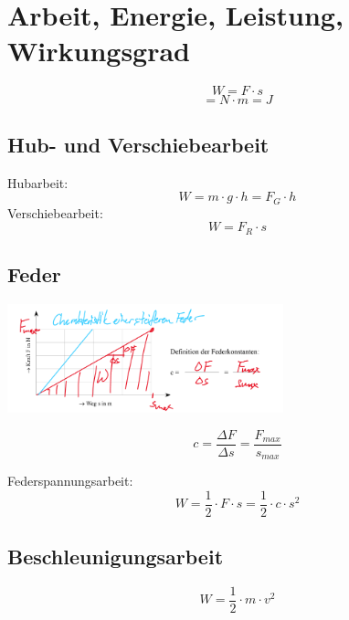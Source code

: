 \documentclass[a4paper]{IEEEtran}
\begin{document}
  \section{Arbeit, Energie, Leistung, Wirkungsgrad}
  \begin{equation}
    W = F \cdot s
  \end{equation}
  \begin{equation}
    [W] = N \cdot m = J
  \end{equation}

  \subsection{Hub- und Verschiebearbeit}
  Hubarbeit:
  \begin{equation}
    W = m \cdot g \cdot h = F_G \cdot h
  \end{equation}
  Verschiebearbeit:
  \begin{equation}
    W = F_R \cdot s
  \end{equation}

  \subsection{Feder}
  \begin{center}
    \includegraphics[width=8cm]{images/spring.png}
  \end{center}

  \begin{equation}
    c = \frac{\Delta F}{\Delta s} = \frac{F_{max}}{s_{max}}
  \end{equation}
  
  Federspannungsarbeit:
  \begin{equation}
    W = \frac{1}{2} \cdot F \cdot s = \frac{1}{2} \cdot c \cdot s^2
  \end{equation}
  
  \subsection{Beschleunigungsarbeit}
  \begin{equation}
    W = \frac{1}{2} \cdot m \cdot v^2
  \end{equation}
\end{document}
